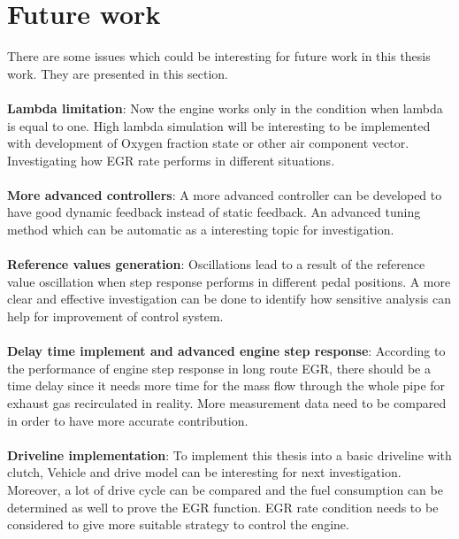  \chapter{Future work}\label{cha:future}
 There are some issues which could be interesting for future work in this thesis work. They are presented in this section.\\
 \\
\textbf{Lambda limitation}: Now the engine works only in the condition when lambda is equal to one. High lambda simulation will be interesting to be implemented with development of Oxygen fraction state or other air component vector. Investigating how EGR rate performs in different situations.\\
\\
\textbf{More advanced controllers}: A more advanced controller can be developed to have good dynamic feedback instead of static feedback. An advanced tuning method which can be automatic as a interesting topic for investigation.  \\
\\
\textbf{Reference values generation}: Oscillations lead to a result of the reference value oscillation when step response performs in different pedal positions. A more clear and effective investigation can be done to identify how sensitive analysis can help for improvement of control system.  \\
\\
\textbf{Delay time implement and advanced engine step response}: According to the performance of engine step response in long route EGR, there should be a time delay since it needs more time for the mass flow through the whole pipe for exhaust gas recirculated in reality. More measurement data need to be compared in order to have more accurate contribution. \\
\\
\textbf{Driveline implementation}: To implement this thesis into a basic driveline with clutch, Vehicle and drive model can be interesting for next investigation. Moreover, a lot of drive cycle can be compared and the fuel consumption can be determined as well to prove the EGR function. EGR rate condition needs to be considered to give more suitable strategy to control the engine. \\